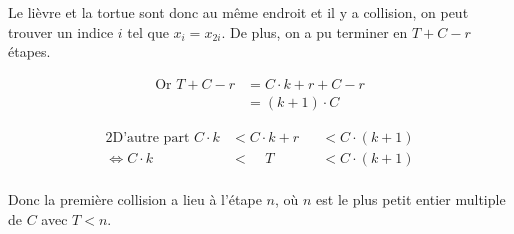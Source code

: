         Le lièvre et la tortue sont donc au même endroit et il y a collision, on peut trouver un indice $i$ tel que $x_i = x_{2i}$. De plus, on a pu terminer en $T + C - r$ étapes.

        \begin{align*}
          \text{Or } T + C - r &= C \cdot k + r + C - r \\
                               &=(k + 1) \cdot C
        \end{align*}

        \begin{alignat*}{2}
          \text{D'autre part } C \cdot k &< C \cdot k + r &&< C \cdot (k + 1) \\
                         \iff  C \cdot k &< \ \ \ \ \ T   &&< C \cdot (k + 1) \\
        \end{alignat*}

        Donc la première collision a lieu à l'étape $n$, où $n$ est le plus petit entier multiple de $C$ avec $T < n$.

